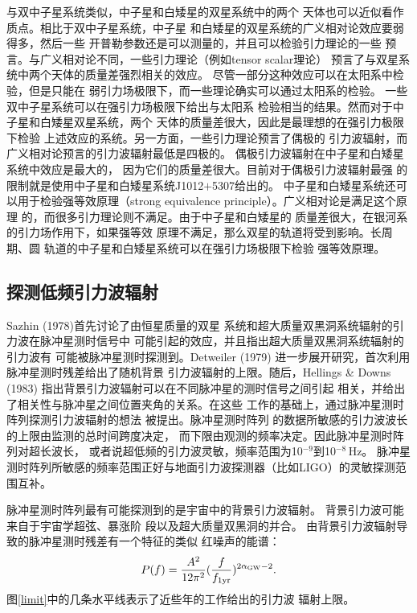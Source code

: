与双中子星系统类似，中子星和白矮星的双星系统中的两个
天体也可以近似看作质点。相比于双中子星系统，中子星
和白矮星的双星系统的广义相对论效应要弱得多，然后一些
开普勒参数还是可以测量的，并且可以检验引力理论的一些
预言。与广义相对论不同，一些引力理论（例如tensor scalar理论）
预言了与双星系统中两个天体的质量差强烈相关的效应。
尽管一部分这种效应可以在太阳系中检验，但是只能在
弱引力场极限下，而一些理论确实可以通过太阳系的检验\supercite{de96}。
一些双中子星系统可以在强引力场极限下给出与太阳系
检验相当的结果。然而对于中子星和白矮星双星系统，两个
天体的质量差很大，因此是最理想的在强引力极限下检验
上述效应的系统。另一方面，一些引力理论预言了偶极的
引力波辐射，而广义相对论预言的引力波辐射最低是四极的。
偶极引力波辐射在中子星和白矮星系统中效应是最大的，
因为它们的质量差很大。目前对于偶极引力波辐射最强
的限制就是使用中子星和白矮星系统J1012$+$5307给出的\supercite{lcw+01}。
中子星和白矮星系统还可以用于检验强等效原理（strong 
equivalence principle）。广义相对论是满足这个原理
的，而很多引力理论则不满足。由于中子星和白矮星的
质量差很大，在银河系的引力场作用下，如果强等效
原理不满足，那么双星的轨道将受到影响。长周期、圆
轨道的中子星和白矮星系统可以在强引力场极限下检验
强等效原理\supercite{ds91}。

\subsection{探测低频引力波辐射}

Sazhin (1978)\supercite{saz78}首先讨论了由恒星质量的双星
系统和超大质量双黑洞系统辐射的引力波在脉冲星测时信号中
可能引起的效应，并且指出超大质量双黑洞系统辐射的引力波有
可能被脉冲星测时探测到。Detweiler (1979)\supercite{det79}
进一步展开研究，首次利用脉冲星测时残差给出了随机背景
引力波辐射的上限。随后，Hellings \& Downs (1983)\supercite{hd83}
指出背景引力波辐射可以在不同脉冲星的测时信号之间引起
相关，并给出了相关性与脉冲星之间位置夹角的关系。在这些
工作的基础上，通过脉冲星测时阵列探测引力波辐射的想法
被提出\supercite{Foster90}。脉冲星测时阵列
的数据所敏感的引力波波长的上限由监测的总时间跨度决定，
而下限由观测的频率决定。因此脉冲星测时阵列对超长波长，
或者说超低频的引力波灵敏，频率范围为10$^{-9}$到10$^{-8}$\,Hz。
脉冲星测时阵列所敏感的频率范围正好与地面引力波探测器（比如LIGO）的灵敏探测范围互补。

脉冲星测时阵列最有可能探测到的是宇宙中的背景引力波辐射。
背景引力波可能来自于宇宙学超弦\supercite{sbs12}、暴涨阶
段\supercite{zhao11}以及超大质量双黑洞的并合\supercite{svc08}。
由背景引力波辐射导致的脉冲星测时残差有一个特征的类似
红噪声的能谱\supercite{hobbs12b}：
\begin{equation}
P(f)=\frac{A^2}{12\pi^2}(\frac{f}{f_{\rm{1yr}}})^{2\alpha_{\rm{GW}}-2}.
\end{equation}
图\ref{limit}中的几条水平线表示了近些年的工作给出的引力波
辐射上限\supercite{jhv+06,vlj+11,dfg+13}。

